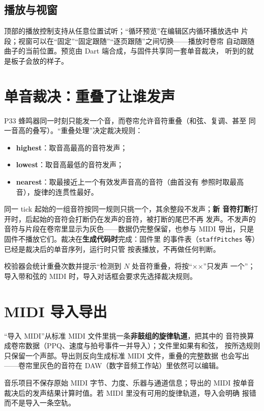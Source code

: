 \subsection{播放与视窗}

顶部的播放控制支持从任意位置试听；“循环预览”在编辑区内循环播放选中
片段；视窗可以在“固定”“固定跟随”“逐页跟随”之间切换——播放时卷帘
自动跟随曲子的当前位置。预览由 Dart 端合成，与固件共享同一套单音裁决，
听到的就是板子会放的样子。

\section{单音裁决：重叠了让谁发声}

P33 蜂鸣器同一时刻只能发一个音，而卷帘允许音符重叠（和弦、复调、甚至
同一音高的叠写）。“重叠处理”决定裁决规则：

\begin{itemize}
  \item \textbf{highest}：取音高最高的音符发声；
  \item \textbf{lowest}：取音高最低的音符发声；
  \item \textbf{nearest}：取最接近上一个有效发声音高的音符（曲首没有
        参照时取最高音），旋律的连贯性最好。
\end{itemize}

同一 tick 起始的一组音符按同一规则只挑一个，其余整段不发声；\textbf{新
音符打断}打开时，后起始的音符会打断仍在发声的音符，被打断的尾巴不再
发声。不发声的音符与片段在卷帘里显示为灰色——数据仍完整保留，也参与
MIDI 导出，只是固件不播放它们。裁决在\textbf{生成代码时}完成：固件里
的事件表（\texttt{staffPitches} 等）已经是裁决后的单音序列，运行时只管
按表播放，不再做任何判断。

校验器会统计重叠次数并提示“检测到 $N$ 处音符重叠，将按“××”只发声
一个”；导入带和弦的 MIDI 时，导入对话框会要求先选择裁决规则。

\section{MIDI 导入导出}

“导入 MIDI”从标准 MIDI 文件里挑一条\textbf{非鼓组的旋律轨道}，把其中的
音符换算成卷帘数据（PPQ、速度与拍号事件一并导入）；文件里如果有和弦，
按所选规则只保留一个声部。导出则反向生成标准 MIDI 文件，重叠的完整数据
也会写出——卷帘里灰色的音符在 DAW（数字音频工作站）里依然可以编辑。

音乐项目不保存原始 MIDI 字节、力度、乐器与通道信息；导出的 MIDI 按单音
裁决后的发声结果计算时值。若 MIDI 里没有可用的旋律轨道，导入会明确
报错而不是导入一条空轨。

